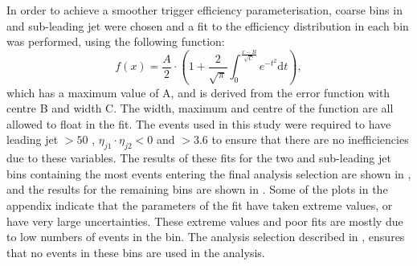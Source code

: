 In order to achieve a smoother trigger efficiency parameterisation, coarse bins in \Mjj and sub-leading jet \pt were chosen and a fit to the \METnoMU efficiency distribution in each bin was performed, using the following function:
\begin{equation}
  \label{eq:parkedtrigfunc}
  f\left(x\right)=\frac{A}{2}\cdot\left(1+ \frac{2}{\sqrt{\pi}}\int_{0}^{\frac{x-B}{\sqrt{C}}}e^{-t^{2}}\mathrm{d}t\right),
\end{equation}
which has a maximum value of A, and is derived from the error function with centre B and width C. The width, maximum and centre of the function are all allowed to float in the fit. The events used in this study were required to have leading jet \pt$>50$ \GeV, $\eta_{j1}\cdot\eta_{j2}<0$ and \detajj$>3.6$ to ensure that there are no inefficiencies due to these variables. The results of these fits for the two \Mjj and sub-leading jet \pt bins containing the most events entering the final analysis selection are shown in , and the results for the remaining bins are shown in . Some of the plots in the appendix indicate that the parameters of the fit have taken extreme values, or have very large uncertainties. These extreme values and poor fits are mostly due to low numbers of events in the bin. The analysis selection described in , ensures that no events in these bins are used in the analysis.

